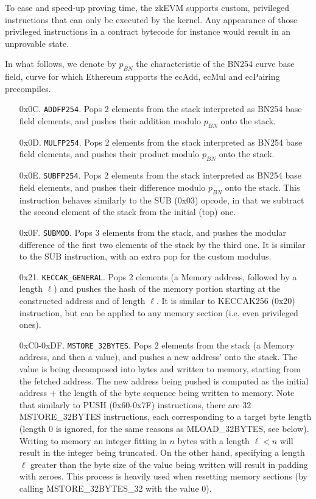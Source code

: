 To ease and speed-up proving time, the zkEVM supports custom, privileged instructions that can only be executed by the kernel.
Any appearance of those privileged instructions in a contract bytecode for instance would result in an unprovable state.

In what follows, we denote by $p_{BN}$ the characteristic of the BN254 curve base field, curve for which Ethereum supports the 
ecAdd, ecMul and ecPairing precompiles.

\begin{enumerate}[align=left]
  \item[0x0C.] \texttt{ADDFP254}. Pops 2 elements from the stack interpreted as BN254 base field elements, and pushes their addition modulo $p_{BN}$ onto the stack.

  \item[0x0D.] \texttt{MULFP254}. Pops 2 elements from the stack interpreted as BN254 base field elements, and pushes their product modulo $p_{BN}$ onto the stack.

  \item[0x0E.] \texttt{SUBFP254}. Pops 2 elements from the stack interpreted as BN254 base field elements, and pushes their difference modulo $p_{BN}$ onto the stack.
  This instruction behaves similarly to the SUB (0x03) opcode, in that we subtract the second element of the stack from the initial (top) one.

  \item[0x0F.] \texttt{SUBMOD}. Pops 3 elements from the stack, and pushes the modular difference of the first two elements of the stack by the third one.
  It is similar to the SUB instruction, with an extra pop for the custom modulus.

  \item[0x21.] \texttt{KECCAK\_GENERAL}. Pops 2 elements (a Memory address, followed by a length $\ell$) and pushes the hash of the memory portion starting at the
  constructed address and of length $\ell$. It is similar to KECCAK256 (0x20) instruction, but can be applied to any memory section (i.e. even privileged ones).

  \item[0xC0-0xDF.] \texttt{MSTORE\_32BYTES}. Pops 2 elements from the stack (a Memory address, and then a value), and pushes
  a new address' onto the stack. The value is being decomposed into bytes and written to memory, starting from the fetched address. The new address being pushed is computed as the
  initial address + the length of the byte sequence being written to memory. Note that similarly to PUSH (0x60-0x7F) instructions, there are 32 MSTORE\_32BYTES instructions, each
  corresponding to a target byte length (length 0 is ignored, for the same reasons as MLOAD\_32BYTES, see below). Writing to memory an integer fitting in $n$ bytes with a length $\ell < n$ will
  result in the integer being truncated. On the other hand, specifying a length $\ell$ greater than the byte size of the value being written will result in padding with zeroes. This
  process is heavily used when resetting memory sections (by calling MSTORE\_32BYTES\_32 with the value 0).


\end{enumerate}
